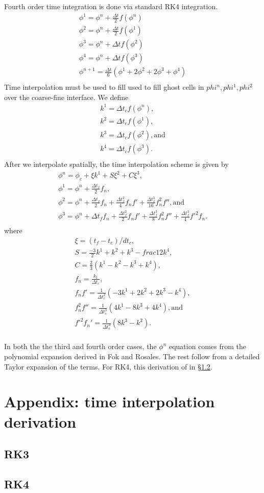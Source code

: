 \documentclass{article}
\newcommand{\dt}{{\Delta t}}
\begin{document}
Fourth order time integration is done via standard RK4 integration.
$$
\begin{array}{l}
\phi^1 = \phi^n + \frac{\dt}{2} f(\phi^n) \\
\phi^2 = \phi^n + \frac{\dt}{2} f(\phi^1) \\
\phi^3 = \phi^n + \dt f(\phi^2) \\
\phi^4 = \phi^n + \dt f(\phi^3) \\
\phi^{n+1} = \frac{\dt}{6}(\phi^1 + 2 \phi^2 + 2 \phi^3 + \phi^4) \\
\end{array}
$$
Time interpolation must be used to fill used to fill ghost cells in
$phi^n, phi^1, phi^2$ over the coarse-fine interface.  We define
$$
\begin{array}{l}
k^1 =  \dt_c f(\phi^n),\\
k^2 =  \dt_c f(\phi^1),\\
k^3 =  \dt_c f(\phi^2), \mbox{and}\\
k^4 =  \dt_c f(\phi^3).\\
\end{array}
$$
After we interpolate spatially, the time interpolation scheme is given
by 
$$
\begin{array}{l}
\phi^n = \phi_c + \xi k^1 + S \xi^2 + C \xi^3, \\
\phi^1 = \phi^n + \frac{\dt_f}{2} f_n, \\
\phi^2 = \phi^n + \frac{\dt_f}{2} f_n + \frac{\dt_f^2}{4}f_nf' +\frac{\dt_f^3}{16}f_n^2f'', \mbox{and} \\
\phi^3 = \phi^n + \dt_f f_n + \frac{\dt_f^2}{2}f_nf' 
+\frac{\dt_f^3}{8}f_n^2f''  +  \frac{\dt_f^3}{4}f'^2f_n.   \\
\end{array}
$$
where 
$$
\begin{array}{l}
\xi = (t_f- t_c)/dt_c, \\
S = \frac{-3}{2} k^1 + k^2 + k^3 - frac{1}{2} k^4, \\
C = \frac{2}{3}(k^1 - k^2 - k^3 + k^4), \\
f_n =  \frac{k_1}{\dt_c}, \\
f_nf' =  \frac{1}{\dt_c^2} (-3 k^1 + 2 k^2 + 2 k^3 - k^4),\\
f_n^2f'' =  \frac{1}{\dt_c^3} (4 k^1 - 8 k^3 +4 k^4), \mbox{and}\\
f'^2f_n' =  \frac{1}{\dt_c^3} (8 k^3 - k^2). \\
\end{array}
$$

In both the the third and fourth order cases, the $\phi^n$ equation
comes from the polynomial expansion derived in Fok and Rosales.   The
rest follow from a detailed Taylor expansion of the terms.
For RK4, this derivation of in \S \ref{sec::rk4deriv}.

\section{Appendix: time interpolation derivation}
\subsection{RK3}
\label{sec::rk3deriv}
\subsection{RK4}
\label{sec::rk4deriv}


\end{document}

